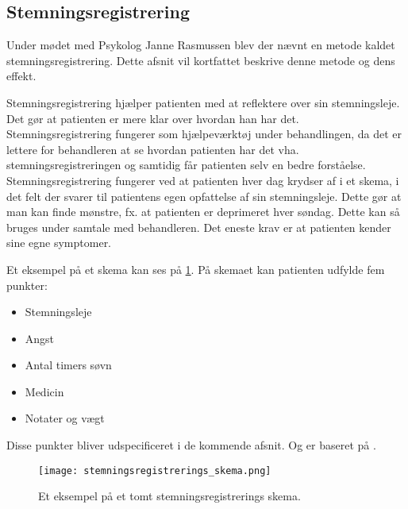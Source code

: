 \subsection{Stemningsregistrering}\label{stemningsleje::stemningsregistrering}
Under mødet med Psykolog Janne Rasmussen\cite[Afsnit 1.3, Møde med Psykolog Janne Rasmussen]{faelles} blev der nævnt en metode kaldet stemningsregistrering.
Dette afsnit vil kortfattet beskrive denne metode og dens effekt.

Stemningsregistrering\cite[Appendiks F, Stemningsregistrering]{faelles} hjælper patienten med at reflektere over sin stemningsleje.
Det gør at patienten er mere klar over hvordan han har det.
Stemningsregistrering fungerer som hjælpeværktøj under behandlingen, da det er lettere for behandleren at se hvordan patienten har det vha. stemningsregistreringen og samtidig får patienten selv en bedre forståelse.
Stemningsregistrering fungerer ved at patienten hver dag krydser af i et skema, i det felt der svarer til patientens egen opfattelse af sin stemningsleje.
Dette gør at man kan finde mønstre, fx. at patienten er deprimeret hver søndag.
Dette kan så bruges under samtale med behandleren.
Det eneste krav er at patienten kender sine egne symptomer.

Et eksempel på et skema kan ses på \cref{figure::stemningsregistrerings_skema}.
På skemaet kan patienten udfylde fem punkter:
\begin{itemize}
	\item Stemningsleje
	\item Angst
	\item Antal timers søvn
	\item Medicin
	\item Notater og vægt
\end{itemize}
Disse punkter bliver udspecificeret i de kommende afsnit. 
Og er baseret på \citet[Appendiks F, Stemningsregistrering]{faelles}.

\begin{figure}
	\texttt{[image: stemningsregistrerings\_skema.png]}
	\caption{Et eksempel på et tomt stemningsregistrerings skema.}
	\label{figure::stemningsregistrerings_skema}
\end{figure}

